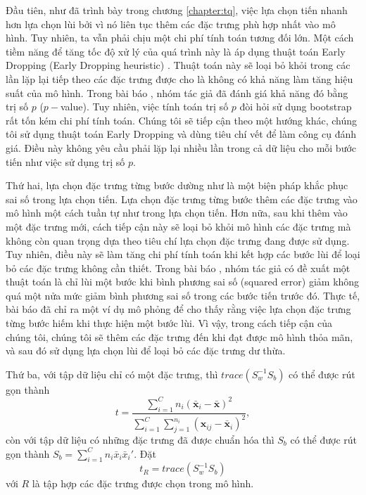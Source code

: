 Đầu tiên, như đã trình bày trong chương \ref{chapter:tq}, việc lựa chọn tiến nhanh hơn lựa chọn lùi bởi vì nó liên tục thêm các đặc trưng phù hợp nhất vào mô hình. Tuy nhiên, ta vẫn phải chịu một chi phí tính toán tương đối lớn. Một cách tiềm năng để tăng tốc độ xử lý của quá trình này là áp dụng thuật toán Early Dropping (Early Dropping heuristic) \cite{borboudakis2019forward}. Thuật toán này sẽ loại bỏ khỏi trong các lần lặp lại tiếp theo các đặc trưng được cho là không có khả năng làm tăng hiệu suất của mô hình. Trong bài báo \cite{borboudakis2019forward}, nhóm tác giả đã đánh giá khả năng đó bằng trị số $p$ ($p-$value). Tuy nhiên, việc tính toán trị số $p$ đòi hỏi sử dụng bootstrap rất tốn kém chi phí tính toán. Chúng tôi sẽ tiếp cận theo một hướng khác, chúng tôi sử dụng thuật toán Early Dropping và dùng tiêu chí vết để làm công cụ đánh giá. Điều này không yêu cầu phải lặp lại nhiều lần trong cả dữ liệu cho mỗi bước tiến như việc sử dụng trị số $p$.

Thứ hai, lựa chọn đặc trưng từng bước dường như là một biện pháp khắc phục sai số trong lựa chọn tiến. Lựa chọn đặc trưng từng bước thêm các đặc trưng vào mô hình một cách tuần tự như trong lựa chọn tiến. Hơn nữa, sau khi thêm vào một đặc trưng mới, cách tiếp cận này sẽ loại bỏ khỏi mô hình các đặc trưng mà không còn quan trọng dựa theo tiêu chí lựa chọn đặc trưng đang được sử dụng. Tuy nhiên, điều này sẽ làm tăng chi phí tính toán khi kết hợp các bước lùi để loại bỏ các đặc trưng không cần thiết. Trong bài báo \cite{zhang2011adaptive}, nhóm tác giả có đề xuất một thuật toán là chỉ lùi một bước khi bình phương sai số (squared error) giảm không quá một nửa mức giảm bình phương sai số trong các bước tiến trước đó. Thực tế, bài báo \cite{nguyen2019faster} đã chỉ ra một ví dụ mô phỏng để cho thấy rằng việc lựa chọn đặc trưng từng bước hiếm khi thực hiện một bước lùi. Vì vậy, trong cách tiếp cận của chúng tôi, chúng tôi sẽ thêm các đặc trưng đến khi đạt được mô hình thỏa mãn, và sau đó sử dụng lựa chọn lùi để loại bỏ các đặc trưng dư thừa.

Thứ ba, với tập dữ liệu chỉ có một đặc trưng, thì $trace(S_w^{-1}S_b)$ có thể được rút gọn thành \begin{equation}
	t = \frac{\sum_{i=1}^C n_i(\bar{\boldsymbol{x} }_i-\bar{\boldsymbol{x} })^2}{\sum_{i=1}^C\sum_{j=1}^{n_i}(\boldsymbol{x} _{ij}-\bar{\boldsymbol{x} }_i)^2},
\end{equation} còn với tập dữ liệu có những đặc trưng đã được chuẩn hóa thì $S_b$ có thể được rút gọn thành $S_b = \sum_{i=1}^C n_i \bar{x}_i \bar{x}_i'$. Đặt \begin{equation}
	t_R = trace(S^{-1}_wS_b)
\end{equation} với $R$ là tập hợp các đặc trưng được chọn trong mô hình.

